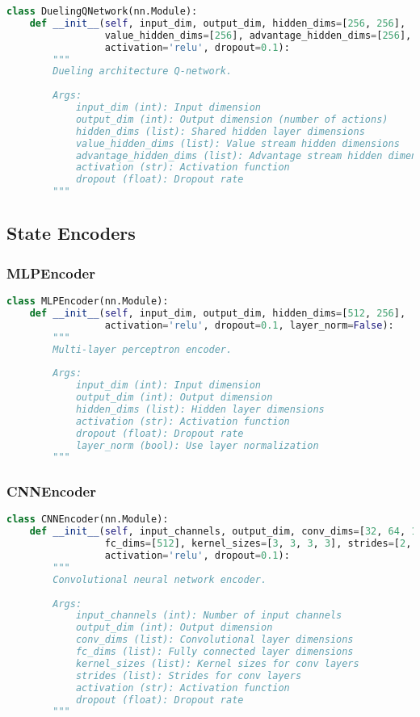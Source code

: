 \begin{lstlisting}[language=python]
class DuelingQNetwork(nn.Module):
    def __init__(self, input_dim, output_dim, hidden_dims=[256, 256],
                 value_hidden_dims=[256], advantage_hidden_dims=[256],
                 activation='relu', dropout=0.1):
        """
        Dueling architecture Q-network.
        
        Args:
            input_dim (int): Input dimension
            output_dim (int): Output dimension (number of actions)
            hidden_dims (list): Shared hidden layer dimensions
            value_hidden_dims (list): Value stream hidden dimensions
            advantage_hidden_dims (list): Advantage stream hidden dimensions
            activation (str): Activation function
            dropout (float): Dropout rate
        """
\end{lstlisting}

\subsection{State Encoders}

\subsubsection{MLPEncoder}

\begin{lstlisting}[language=python]
class MLPEncoder(nn.Module):
    def __init__(self, input_dim, output_dim, hidden_dims=[512, 256],
                 activation='relu', dropout=0.1, layer_norm=False):
        """
        Multi-layer perceptron encoder.
        
        Args:
            input_dim (int): Input dimension
            output_dim (int): Output dimension
            hidden_dims (list): Hidden layer dimensions
            activation (str): Activation function
            dropout (float): Dropout rate
            layer_norm (bool): Use layer normalization
        """
\end{lstlisting}

\subsubsection{CNNEncoder}

\begin{lstlisting}[language=python]
class CNNEncoder(nn.Module):
    def __init__(self, input_channels, output_dim, conv_dims=[32, 64, 128, 256],
                 fc_dims=[512], kernel_sizes=[3, 3, 3, 3], strides=[2, 2, 2, 2],
                 activation='relu', dropout=0.1):
        """
        Convolutional neural network encoder.
        
        Args:
            input_channels (int): Number of input channels
            output_dim (int): Output dimension
            conv_dims (list): Convolutional layer dimensions
            fc_dims (list): Fully connected layer dimensions
            kernel_sizes (list): Kernel sizes for conv layers
            strides (list): Strides for conv layers
            activation (str): Activation function
            dropout (float): Dropout rate
        """
\end{lstlisting}

